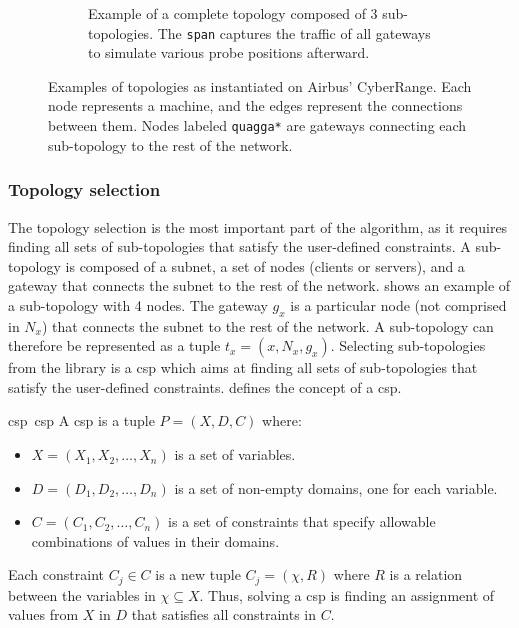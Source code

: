\begin{figure}[t]
\begin{subfigure}[b]{0.64\linewidth}
    \caption{
      Example of a complete topology composed of 3 sub-topologies.
      The \texttt{span} captures the traffic of all gateways to simulate various probe positions afterward.
      \label{fig:topologies.topology}
    }
  \end{subfigure}
  \caption{
    Examples of topologies as instantiated on Airbus' CyberRange.
    Each node represents a machine, and the edges represent the connections between them.
    Nodes labeled \texttt{quagga*} are gateways connecting each sub-topology to the rest of the network.
  }
\end{figure}


\subsubsection{Topology selection}

The topology selection is the most important part of the algorithm, as it requires finding all sets of sub-topologies that satisfy the user-defined constraints.
A sub-topology is composed of a subnet, a set of nodes (clients or servers), and a gateway that connects the subnet to the rest of the network.
 shows an example of a sub-topology with 4 nodes.
The gateway $g_x$ is a particular node (not comprised in $N_x$) that connects the subnet to the rest of the network.
A sub-topology can therefore be represented as a tuple $t_x = ( x, N_x, g_x )$.
Selecting sub-topologies from the library is a \gls{csp} which aims at finding all sets of sub-topologies that satisfy the user-defined constraints.
 defines the concept of a \gls{csp}.

\begin{definitionbox}{\acrfull{csp}~\normalfont\cite{russell_Artificialintelligencemodern_2021}}{csp}
  A \acrfull{csp} is a tuple $P = ( X, D, C )$ where:
  \begin{itemize}
    \item $X = ( X_1, X_2, \ldots, X_n )$ is a set of variables.
    \item $D = ( D_1, D_2, \ldots, D_n )$ is a set of non-empty domains, one for each variable.
    \item $C = ( C_1, C_2, \ldots, C_n )$ is a set of constraints that specify allowable combinations of values in their domains.
  \end{itemize}

  Each constraint $C_j \in C$ is a new tuple $C_j = ( \chi, R )$ where $R$ is a relation between the variables in $\chi \subseteq X$.
  Thus, solving a \gls{csp} is finding an assignment of values from $X$ in $D$ that satisfies all constraints in $C$.
\end{definitionbox}



